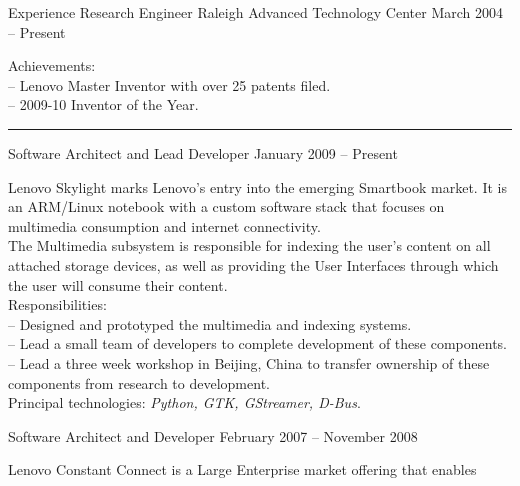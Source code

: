 \documentclass[letterpaper, 11pt]{article}
\begin{document}
    \begin{resume}
        \begin{category}{Experience}
                                         {Research Engineer}
                     {Raleigh Advanced Technology Center} {March 2004 -- Present}
            \par
            Achievements: \\
            -- Lenovo Master Inventor with over 25 patents filed. \\
            -- 2009-10 Inventor of the Year. \\
            \rule{\textwidth}{1pt}
            \begin{block}
                 {Software Architect and Lead Developer}
                         { }               {January 2009 -- Present}
                \par
                Lenovo Skylight marks Lenovo's entry into the emerging Smartbook market.
                It is an ARM/Linux notebook with a custom software stack that focuses
                on multimedia consumption and internet connectivity.
                \\[1ex]
                The Multimedia subsystem is responsible for indexing the user's content on all
                attached storage devices, as well as providing the User Interfaces through which
                the user will consume their content.
                \\[1ex]
                Responsibilities: \\
                -- Designed and prototyped the multimedia and indexing systems. \\
                -- Lead a small team of developers to complete development of these components. \\
                -- Lead a three week workshop in Beijing, China to transfer ownership of these components from research to development.
                \\[1ex]
                Principal technologies: \emph{Python, GTK, GStreamer, D-Bus}.
                \smallskip
            \end{block}
            \begin{block}
                 {Software Architect and Developer}
                         { }                       {February 2007 -- November 2008}
                \par
                Lenovo Constant Connect is a Large Enterprise market offering that enables

\end{block}
\end{category}
\end{resume}
\end{document}
